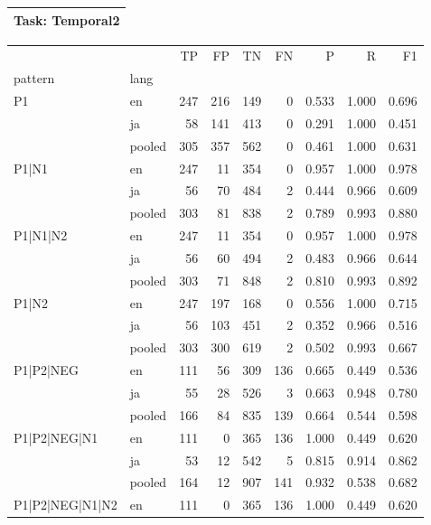 
\begin{table}[h!]
\centering
\begin{tabular}{p{}}
\toprule
\textbf{Task: Temporal2} \\
\midrule
\end{tabular}
\vspace{10pt}
\begin{tabular}{llrrrrrrr}
\toprule
 &  & TP & FP & TN & FN & P & R & F1 \\
pattern & lang &  &  &  &  &  &  &  \\
\midrule
\multirow[t]{3}{*}{P1} & en & 247 & 216 & 149 & 0 & 0.533 & 1.000 & 0.696 \\
 & ja & 58 & 141 & 413 & 0 & 0.291 & 1.000 & 0.451 \\
 & pooled & 305 & 357 & 562 & 0 & 0.461 & 1.000 & 0.631 \\
\cline{1-9}
\multirow[t]{3}{*}{P1|N1} & en & 247 & 11 & 354 & 0 & 0.957 & 1.000 & 0.978 \\
 & ja & 56 & 70 & 484 & 2 & 0.444 & 0.966 & 0.609 \\
 & pooled & 303 & 81 & 838 & 2 & 0.789 & 0.993 & 0.880 \\
\cline{1-9}
\multirow[t]{3}{*}{P1|N1|N2} & en & 247 & 11 & 354 & 0 & 0.957 & 1.000 & 0.978 \\
 & ja & 56 & 60 & 494 & 2 & 0.483 & 0.966 & 0.644 \\
 & pooled & 303 & 71 & 848 & 2 & 0.810 & 0.993 & 0.892 \\
\cline{1-9}
\multirow[t]{3}{*}{P1|N2} & en & 247 & 197 & 168 & 0 & 0.556 & 1.000 & 0.715 \\
 & ja & 56 & 103 & 451 & 2 & 0.352 & 0.966 & 0.516 \\
 & pooled & 303 & 300 & 619 & 2 & 0.502 & 0.993 & 0.667 \\
\cline{1-9}
\multirow[t]{3}{*}{P1|P2|NEG} & en & 111 & 56 & 309 & 136 & 0.665 & 0.449 & 0.536 \\
 & ja & 55 & 28 & 526 & 3 & 0.663 & 0.948 & 0.780 \\
 & pooled & 166 & 84 & 835 & 139 & 0.664 & 0.544 & 0.598 \\
\cline{1-9}
\multirow[t]{3}{*}{P1|P2|NEG|N1} & en & 111 & 0 & 365 & 136 & 1.000 & 0.449 & 0.620 \\
 & ja & 53 & 12 & 542 & 5 & 0.815 & 0.914 & 0.862 \\
 & pooled & 164 & 12 & 907 & 141 & 0.932 & 0.538 & 0.682 \\
\cline{1-9}
\multirow[t]{3}{*}{P1|P2|NEG|N1|N2} & en & 111 & 0 & 365 & 136 & 1.000 & 0.449 & 0.620 \\

\end{tabular}
\end{table}

